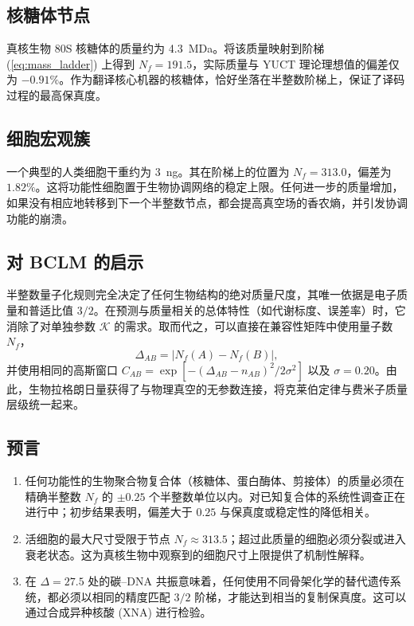 \documentclass[12pt,a4paper]{article}
\newcommand{\REL}{\mathcal{K}}          %
\begin{document}
	\subsection{核糖体节点}
	真核生物 80S 核糖体的质量约为 4.3~MDa。将该质量映射到阶梯 (\ref{eq:mass_ladder}) 上得到 \(N_f = 191.5\)，实际质量与 YUCT 理论理想值的偏差仅为 \(-0.91\%\)。作为翻译核心机器的核糖体，恰好坐落在半整数阶梯上，保证了译码过程的最高保真度。
	
	\subsection{细胞宏观簇}
	一个典型的人类细胞干重约为 3~ng。其在阶梯上的位置为 \(N_f = 313.0\)，偏差为 \(1.82\%\)。这将功能性细胞置于生物协调网络的稳定上限。任何进一步的质量增加，如果没有相应地转移到下一个半整数节点，都会提高真空场的香农熵，并引发协调功能的崩溃。
	
	\subsection{对 BCLM 的启示}
	半整数量子化规则完全决定了任何生物结构的绝对质量尺度，其唯一依据是电子质量和普适比值 \(3/2\)。在预测与质量相关的总体特性（如代谢标度、误差率）时，它消除了对单独参数 \(\REL\) 的需求。取而代之，可以直接在兼容性矩阵中使用量子数 \(N_f\)，
	\[
	\Delta_{AB} = |N_f(A) - N_f(B)|,
	\]
	并使用相同的高斯窗口 \(C_{AB} = \exp[-(\Delta_{AB} - n_{AB})^2/2\sigma^2]\) 以及 \(\sigma=0.20\)。由此，生物拉格朗日量获得了与物理真空的无参数连接，将克莱伯定律与费米子质量层级统一起来。
	
	\subsection{预言}
	\begin{enumerate}
		\item 任何功能性的生物聚合物复合体（核糖体、蛋白酶体、剪接体）的质量必须在精确半整数 \(N_f\) 的 \(\pm 0.25\) 个半整数单位以内。对已知复合体的系统性调查正在进行中；初步结果表明，偏差大于 \(0.25\) 与保真度或稳定性的降低相关。
		\item 活细胞的最大尺寸受限于节点 \(N_f \approx 313.5\)；超过此质量的细胞必须分裂或进入衰老状态。这为真核生物中观察到的细胞尺寸上限提供了机制性解释。
		\item 在 \(\Delta = 27.5\) 处的碳–DNA 共振意味着，任何使用不同骨架化学的替代遗传系统，都必须以相同的精度匹配 \(3/2\) 阶梯，才能达到相当的复制保真度。这可以通过合成异种核酸 (XNA) 进行检验。
	\end{enumerate}
	
\end{document}
